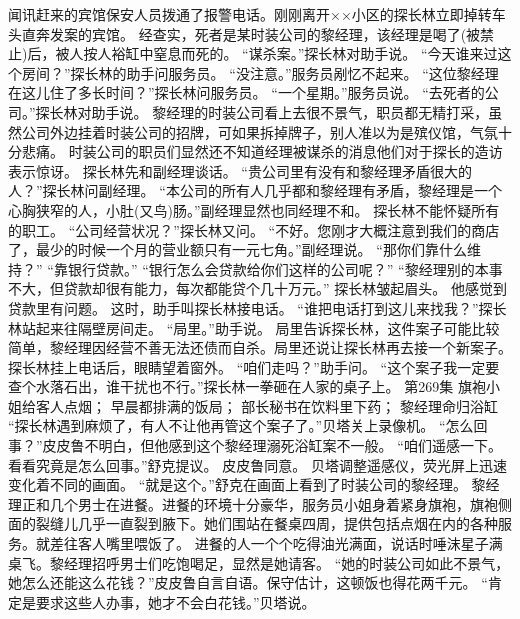 \documentclass[a4paper,12pt,UTF8,twoside]{ctexbook}
\begin{document}
        闻讯赶来的宾馆保安人员拨通了报警电话。刚刚离开××小区的探长林立即掉转车头直奔发案的宾馆。  
        经查实，死者是某时装公司的黎经理，该经理是喝了(被禁止)后，被人按人裕缸中窒息而死的。  
        “谋杀案。”探长林对助手说。  
        “今天谁来过这个房间？”探长林的助手问服务员。  
        “没注意。”服务员剐忆不起来。  
        “这位黎经理在这儿住了多长时间？”探长林问服务员。  
        “一个星期。”服务员说。  
        “去死者的公司。”探长林对助手说。  
        黎经理的时装公司看上去很不景气，职员都无精打采，虽然公司外边挂着时装公司的招牌，可如果拆掉牌子，别人准以为是殡仪馆，气氛十分悲痛。  
        时装公司的职员们显然还不知道经理被谋杀的消息他们对于探长的造访表示惊讶。  
        探长林先和副经理谈话。  
        “贵公司里有没有和黎经理矛盾很大的人？”探长林问副经理。  
        “本公司的所有人几乎都和黎经理有矛盾，黎经理是一个心胸狭窄的人，小肚(又鸟)肠。”副经理显然也同经理不和。        
        探长林不能怀疑所有的职工。  
        “公司经营状况？”探长林又问。  
        “不好。您刚才大概注意到我们的商店了，最少的时候一个月的营业额只有一元七角。”副经理说。  
        “那你们靠什么维持？”  
        “靠银行贷款。”  
        “银行怎么会贷款给你们这样的公司呢？”  
        “黎经理别的本事不大，但贷款却很有能力，每次都能贷个几十万元。”  
        探长林皱起眉头。  
        他感觉到贷款里有问题。  
        这时，助手叫探长林接电话。  
        “谁把电话打到这儿来找我？”探长林站起来往隔壁房间走。  
        “局里。”助手说。  
        局里告诉探长林，这件案子可能比较简单，黎经理因经营不善无法还债而自杀。局里还说让探长林再去接一个新案子。  
        探长林挂上电话后，眼睛望着窗外。  
        “咱们走吗？”助手问。  
        “这个案子我一定要查个水落石出，谁干扰也不行。”探长林一拳砸在人家的桌子上。          第269集  
        旗袍小姐给客人点烟；  
        早晨都排满的饭局；  
        部长秘书在饮料里下药；  
        黎经理命归浴缸    
        “探长林遇到麻烦了，有人不让他再管这个案子了。”贝塔关上录像机。  
        “怎么回事？”皮皮鲁不明白，但他感到这个黎经理溺死浴缸案不一般。  
        “咱们遥感一下。看看究竟是怎么回事。”舒克提议。  
        皮皮鲁同意。  
        贝塔调整遥感仪，荧光屏上迅速变化着不同的画面。  
        “就是这个。”舒克在画面上看到了时装公司的黎经理。        
        黎经理正和几个男士在进餐。进餐的环境十分豪华，服务员小姐身着紧身旗袍，旗袍侧面的裂缝儿几乎一直裂到腋下。她们围站在餐桌四周，提供包括点烟在内的各种服务。就差往客人嘴里喂饭了。  
        进餐的人一个个吃得油光满面，说话时唾沫星子满桌飞。黎经理招呼男士们吃饱喝足，显然是她请客。  
        “她的时装公司如此不景气，她怎么还能这么花钱？”皮皮鲁自言自语。保守估计，这顿饭也得花两千元。  
        “肯定是要求这些人办事，她才不会白花钱。”贝塔说。  
\end{document}
